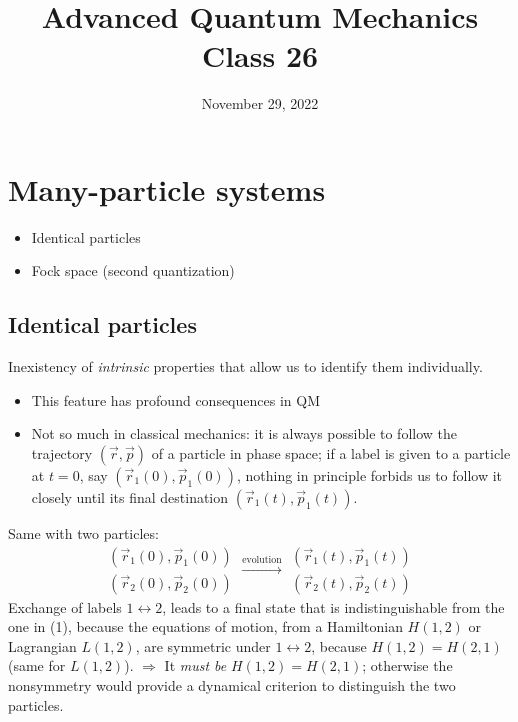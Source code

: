 \documentclass[12pt]{article}
\title{Advanced Quantum Mechanics\\Class 26}
\date{November 29, 2022}                                           %
\newcommand{\be}{\begin{equation}}
\newcommand{\ee}{\end{equation}}
\begin{document}
\maketitle

\setcounter{section}{8}


\section{Many-particle systems}

\begin{itemize}
\item Identical particles
\item Fock space (second quantization)
\end{itemize}

\subsection{Identical particles}

Inexistency of \emph{intrinsic} properties that allow us to
identify them individually.

\begin{itemize}
\item This feature has profound consequences in QM
\item Not so much in classical mechanics: it is always possible
to follow the trajectory $(\vec{r}, \vec{p})$ of a particle in phase space;
if a label is given to a particle at $t=0$, say $\left(\vec{r}_{1}(0), \vec{p}_{1}(0)\right)$,
nothing in principle forbids us to follow it closely
until its final destination $\left(\vec{r}_{1}(t), \vec{p}_{1}(t)\right)$.
\end{itemize}

Same with two particles:
\be
\begin{aligned}
(\vec{r}_1(0), \vec{p}_1(0))\\
(\vec{r}_2(0), \vec{p}_2(0))
\end{aligned}
\xrightarrow{\text{evolution}}
\begin{aligned}
(\vec{r}_1(t), \vec{p}_1(t))\\
(\vec{r}_2(t), \vec{p}_2(t))
\end{aligned}
\ee
Exchange of labels $1 \leftrightarrow 2$, leads to a final state
that is indistinguishable from the one in (1), because
the equations of motion, from a Hamiltonian $H(1,2)$
or Lagrangian $L(1,2)$, are symmetric under
$1 \leftrightarrow 2$, because $H(1,2)=H(2,1)$ (same for $L(1,2)$).
$\Rightarrow$ It \emph{must be} $H(1,2)=H(2,1)$; 
otherwise the nonsymmetry
would provide a dynamical criterion
to distinguish the two particles.
\end{document}

